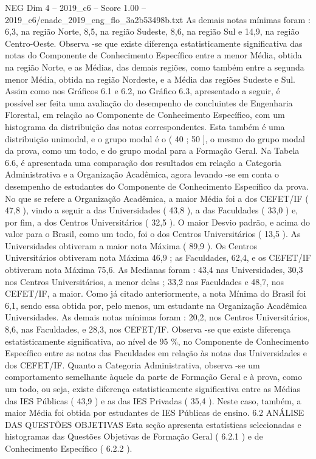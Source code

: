 \begin{textsample}{NEG Dim 4 – 2019\_c6 – Score 1.00 – 2019\_c6/enade\_2019\_eng\_flo\_3a2b53498b.txt}
As demais notas mínimas foram : 6,3, na região Norte, 8,5, na região Sudeste, 8,6, na região Sul e 14,9, na região Centro-Oeste.
Observa -se que existe diferença estatisticamente significativa das notas do Componente de Conhecimento Específico entre a menor Média, obtida na região Norte, e as Médias, das demais regiões, como também entre a segunda menor Média, obtida na região Nordeste, e a Média das regiões Sudeste e Sul.
Assim como nos Gráficos 6.1 e 6.2, no Gráfico 6.3, apresentado a seguir, é possível ser feita uma avaliação do desempenho de concluintes de Engenharia Florestal, em relação ao Componente de Conhecimento Específico, com um histograma da distribuição das notas correspondentes.
Esta também é uma distribuição unimodal, e o grupo modal é o ( 40 ; 50 ], o mesmo do grupo modal da prova, como um todo, e do grupo modal para a Formação Geral.
Na Tabela 6.6, é apresentada uma comparação dos resultados em relação a Categoria Administrativa e a Organização Acadêmica, agora levando -se em conta o desempenho de estudantes do Componente de Conhecimento Específico da prova.
No que se refere a Organização Acadêmica, a maior Média foi a dos CEFET/IF ( 47,8 ), vindo a seguir a das Universidades ( 43,8 ), a das Faculdades ( 33,0 ) e, por fim, a dos Centros Universitários ( 32,5 ).
O maior Desvio padrão, e acima do valor para o Brasil, como um todo, foi o dos Centros Universitários ( 13,5 ).
As Universidades obtiveram a maior nota Máxima ( 89,9 ).
Os Centros Universitários obtiveram nota Máxima 46,9 ; as Faculdades, 62,4, e os CEFET/IF obtiveram nota Máxima 75,6.
As Medianas foram : 43,4 nas Universidades, 30,3 nos Centros Universitários, a menor delas ; 33,2 nas Faculdades e 48,7, nos CEFET/IF, a maior.
Como já citado anteriormente, a nota Mínima do Brasil foi 6,1, sendo essa obtida por, pelo menos, um estudante na Organização Acadêmica Universidades.
As demais notas mínimas foram : 20,2, nos Centros Universitários, 8,6, nas Faculdades, e 28,3, nos CEFET/IF.
Observa -se que existe diferença estatisticamente significativa, ao nível de 95 \%, no Componente de Conhecimento Específico entre as notas das Faculdades em relação às notas das Universidades e dos CEFET/IF.
Quanto a Categoria Administrativa, observa -se um comportamento semelhante àquele da parte de Formação Geral e à prova, como um todo, ou seja, existe diferença estatisticamente significativa entre as Médias das IES Públicas ( 43,9 ) e as das IES Privadas ( 35,4 ).
Neste caso, também, a maior Média foi obtida por estudantes de IES Públicas de ensino. 6.2 ANÁLISE DAS QUESTÕES OBJETIVAS Esta seção apresenta estatísticas selecionadas e histogramas das Questões Objetivas de Formação Geral ( 6.2.1 ) e de Conhecimento Específico ( 6.2.2 ).

\end{textsample}
